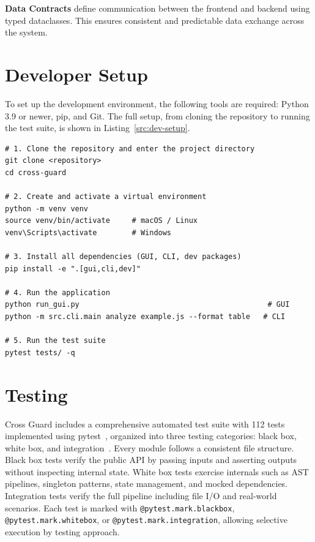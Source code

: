 \textbf{Data Contracts} define communication between the frontend and backend using typed dataclasses. This ensures consistent and predictable data exchange across the system.

\section{Developer Setup}
\label{sec:setup}

To set up the development environment, the following tools are required: Python 3.9 or newer, pip, and Git. The full setup, from cloning the repository to running the test suite, is shown in Listing~\ref{src:dev-setup}.

\begin{lstlisting}[caption={Complete developer setup: clone, virtual environment, install, run, and test}, label=src:dev-setup, basicstyle=\ttfamily\small, breaklines=true]
# 1. Clone the repository and enter the project directory
git clone <repository>
cd cross-guard

# 2. Create and activate a virtual environment
python -m venv venv
source venv/bin/activate     # macOS / Linux
venv\Scripts\activate        # Windows

# 3. Install all dependencies (GUI, CLI, dev packages)
pip install -e ".[gui,cli,dev]"

# 4. Run the application
python run_gui.py                                           # GUI
python -m src.cli.main analyze example.js --format table   # CLI

# 5. Run the test suite
pytest tests/ -q
\end{lstlisting}

\section{Testing}
\label{sec:testing}

Cross Guard includes a comprehensive automated test suite with 112 tests implemented using pytest~\cite{pytestdocs}, organized into three testing categories: black box, white box, and integration~\cite{myers2011testing}. Every module follows a consistent file structure. Black box tests verify the public API by passing inputs and asserting outputs without inspecting internal state. White box tests exercise internals such as AST pipelines, singleton patterns, state management, and mocked dependencies. Integration tests verify the full pipeline including file I/O and real-world scenarios. Each test is marked with \texttt{@pytest.mark.blackbox}, \texttt{@pytest.mark.whitebox}, or \texttt{@pytest.mark.integration}, allowing selective execution by testing approach.


